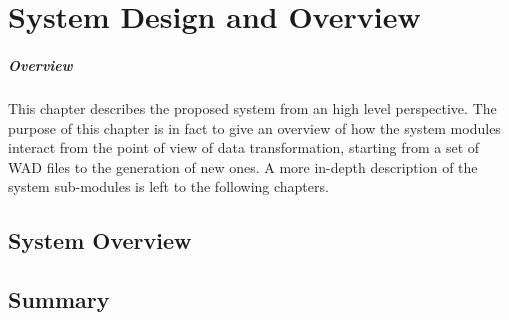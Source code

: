 \chapter{System Design and Overview}
\paragraph{Overview} This chapter describes the proposed system from an high level perspective. The purpose of this chapter is in fact to give an overview of how the system modules interact from the point of view of data transformation, starting from a set of WAD files to the generation of new ones.
A more in-depth description of the system sub-modules is left to the following chapters.
\section{System Overview}

\section{Summary}